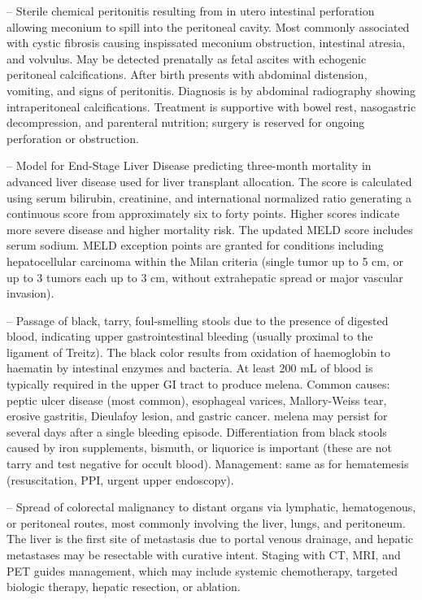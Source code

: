 -- Sterile chemical peritonitis resulting from in utero intestinal perforation allowing meconium to spill into the peritoneal cavity. Most commonly associated with cystic fibrosis causing inspissated meconium obstruction, intestinal atresia, and volvulus. May be detected prenatally as fetal ascites with echogenic peritoneal calcifications. After birth presents with abdominal distension, vomiting, and signs of peritonitis. Diagnosis is by abdominal radiography showing intraperitoneal calcifications. Treatment is supportive with bowel rest, nasogastric decompression, and parenteral nutrition; surgery is reserved for ongoing perforation or obstruction.

-- Model for End-Stage Liver Disease predicting three-month mortality in advanced liver disease used for liver transplant allocation. The score is calculated using serum bilirubin, creatinine, and international normalized ratio generating a continuous score from approximately six to forty points. Higher scores indicate more severe disease and higher mortality risk. The updated MELD score includes serum sodium. MELD exception points are granted for conditions including hepatocellular carcinoma within the Milan criteria (single tumor up to 5 cm, or up to 3 tumors each up to 3 cm, without extrahepatic spread or major vascular invasion).

-- Passage of black, tarry, foul-smelling stools due to the presence of digested blood, indicating upper gastrointestinal bleeding (usually proximal to the ligament of Treitz). The black color results from oxidation of haemoglobin to haematin by intestinal enzymes and bacteria. At least 200 mL of blood is typically required in the upper GI tract to produce melena. Common causes: peptic ulcer disease (most common), esophageal varices, Mallory-Weiss tear, erosive gastritis, Dieulafoy lesion, and gastric cancer. melena may persist for several days after a single bleeding episode. Differentiation from black stools caused by iron supplements, bismuth, or liquorice is important (these are not tarry and test negative for occult blood). Management: same as for hematemesis (resuscitation, PPI, urgent upper endoscopy).

-- Spread of colorectal malignancy to distant organs via lymphatic, hematogenous, or peritoneal routes, most commonly involving the liver, lungs, and peritoneum. The liver is the first site of metastasis due to portal venous drainage, and hepatic metastases may be resectable with curative intent. Staging with CT, MRI, and PET guides management, which may include systemic chemotherapy, targeted biologic therapy, hepatic resection, or ablation.

